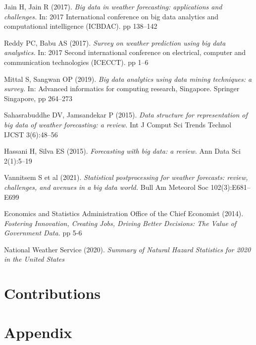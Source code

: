 \documentclass[conference]{IEEEtran}
\begin{document}
\begin{thebibliography}{9}

Jain H, Jain R (2017). \textit{Big data in weather forecasting: applications and challenges.} In: 2017 International conference on big data analytics and computational intelligence (ICBDAC). pp 138–142

Reddy PC, Babu AS (2017). \textit{Survey on weather prediction using big data analystics.} In: 2017 Second international conference on electrical, computer and communication technologies (ICECCT). pp 1–6

Mittal S, Sangwan OP (2019). \textit{Big data analytics using data mining techniques: a survey.} In: Advanced informatics for computing research, Singapore. Springer Singapore, pp 264–273

Sahasrabuddhe DV, Jamsandekar P (2015). \textit{Data structure for representation of big data of weather forecasting: a review.} Int J Comput Sci Trends Technol IJCST 3(6):48–56

Hassani H, Silva ES (2015). \textit{Forecasting with big data: a review.} Ann Data Sci 2(1):5–19

Vannitsem S et al (2021). \textit{Statistical postprocessing for weather forecasts: review, challenges, and avenues in a big data world.} Bull Am Meteorol Soc 102(3):E681–E699

Economics and Statistics Administration Office of the Chief Economist (2014). \textit{Fostering Innovation, Creating Jobs, Driving Better Decisions: The Value of Government Data.} pp 5-6

National Weather Service (2020). \textit{Summary of Natural Hazard Statistics for 2020 in the United States}


\end{thebibliography}

\section{Contributions}

\section{Appendix}
\end{document}
